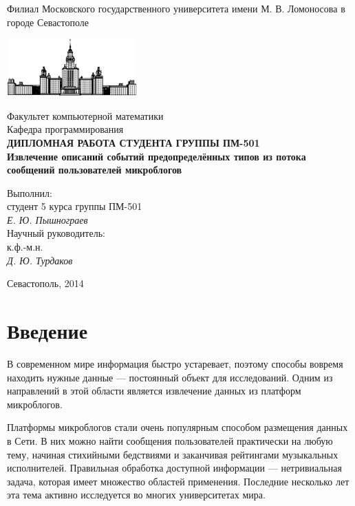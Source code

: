 \documentclass[12pt, a4paper]{article}
\begin{document}
\begin{titlepage}
\begin{center}
    Филиал Московского государственного университета имени М. В. Ломоносова в городе Севастополе

    \bigskip
    \includegraphics[width=50mm]{msu.eps}

    \bigskip
    Факультет компьютерной математики\\
    Кафедра программирования\\[10mm]

    \textsf{\large\bfseries
        ДИПЛОМНАЯ РАБОТА СТУДЕНТА ГРУППЫ ПМ-501\\[10mm]
        Извлечение описаний событий предопределённых типов из потока сообщений пользователей микроблогов
    }\\[10mm]

    \begin{flushright}
        \parbox{0.5\textwidth}{
            Выполнил:\\
            студент 5 курса группы ПМ-501\\
            \emph{Е. Ю. Пышнограев}\\[5mm]
            Научный руководитель:\\
            к.ф.-м.н. \\
            \emph{Д. Ю. Турдаков}
        }
    \end{flushright}

    \vspace{\fill}
    Севастополь, 2014
\end{center}
\end{titlepage}

\tableofcontents\thispagestyle{empty}\newpage

  \section{Введение}
  	В современном мире информация быстро устаревает, поэтому способы вовремя находить нужные данные --- постоянный объект для исследований. Одним из направлений в этой области является извлечение данных из платформ микроблогов.
  	
  	Платформы микроблогов стали очень популярным способом размещения данных в Сети. В них можно найти сообщения пользователей практически на любую тему, начиная стихийными бедствиями и заканчивая рейтингами музыкальных исполнителей. Правильная обработка доступной информации --- нетривиальная задача, которая имеет множество областей применения. Последние несколько лет эта тема активно исследуется во многих университетах мира.
  	
\end{document}
